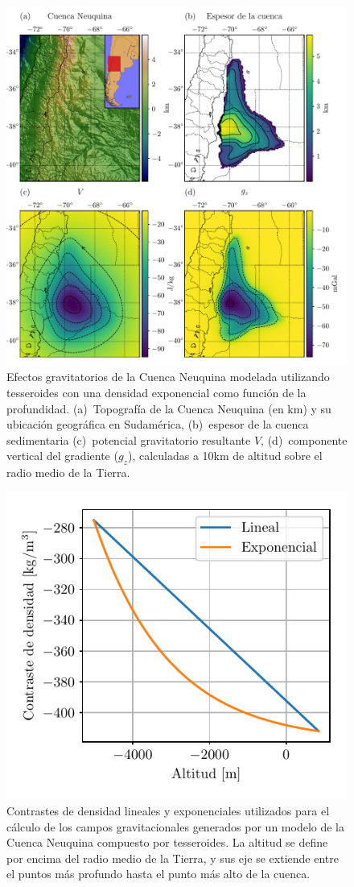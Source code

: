 \begin{figure}
\centering
\includegraphics[width=\linewidth]{figs/tesseroids-variable-density/neuquen-basin.pdf}
\caption{
    Efectos gravitatorios de la Cuenca Neuquina modelada utilizando tesseroides
    con una densidad exponencial como función de la profundidad.
    (a)~Topografía de la Cuenca Neuquina (en km) y su ubicación geográfica en
    Sudamérica,
    (b)~espesor de la cuenca sedimentaria \citep[en metros;][]{heine2007}
    (c)~potencial gravitatorio resultante $V$,
    (d)~componente vertical del gradiente ($g_z$),
    calculadas a 10km de altitud sobre el radio medio de la Tierra.
}
\label{fig:neuquen-basin}
\end{figure}

\begin{figure}
\centering
\includegraphics[width=0.5\linewidth]{figs/tesseroids-variable-density/neuquen-basin-densities.pdf}
\caption{
    Contrastes de densidad lineales y exponenciales utilizados para el cálculo
    de los campos gravitacionales generados por un modelo de la Cuenca Neuquina
    compuesto por tesseroides.
    La altitud se define por encima del radio medio de la Tierra, y sus eje se
    extiende entre el puntos más profundo hasta el punto más alto de la cuenca.
}
\label{fig:neuquen-basin-densities}
\end{figure}


